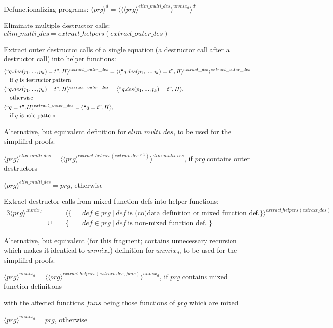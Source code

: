 \documentclass[11pt]{article} %
\begin{document}
Defunctionalizing programs: $\langle prg \rangle^d = \langle \langle \langle prg \rangle^{elim\_multi\_des} \rangle^{unmix_d} \rangle^{d'}$

Eliminate multiple destructor calls: $elim\_multi\_des = extract\_helpers(extract\_outer\_des)$

Extract outer destructor calls of a single equation (a destructor call after a destructor call) into helper functions:
\begin{alignat*}{2}
& \langle `` q.des(p_1, ..., p_k) = t ", H \rangle^{extract\_outer\_des} = \langle \langle `` q.des(p_1, ..., p_k) = t ", H \rangle^{extract\_des} \rangle^{extract\_outer\_des} \\
&\quad \textrm{if $q$ is destructor pattern } \\
& \langle `` q.des(p_1, ..., p_k) = t ", H \rangle^{extract\_outer\_des} = \big\langle `` q.des(p_1, ..., p_k) = t ", H \big\rangle, \\
&\quad \textrm{otherwise} \\
& \langle `` q = t ", H \rangle^{extract\_outer\_des} = \big\langle `` q = t ", H \big\rangle, \\
&\quad \textrm{if $q$ is hole pattern}
\end{alignat*}

\begin{framed}
Alternative, but equivalent definition for $elim\_multi\_des$, to be used for the simplified proofs.

$\langle prg \rangle^{elim\_multi\_des} = \langle \langle prg \rangle^{extract\_helpers(extract\_des^{>1})} \rangle^{elim\_multi\_des}$, if $prg$ contains outer destructors

$\langle prg \rangle^{elim\_multi\_des} = prg$, otherwise

\end{framed}

Extract destructor calls from mixed function defs into helper functions:
\begin{alignat*}{3}
\langle prg \rangle^{unmix_d} & = ~&& \langle \{ && def \in prg ~ | ~ def \textrm{ is (co)data definition or mixed function def.} \} \rangle^{extract\_helpers(extract\_des)} \\
&\cup && \{ && def \in prg ~ | ~ def \textrm{ is non-mixed function def. } \}
\end{alignat*}

\begin{framed}
Alternative, but equivalent (for this fragment; contains unnecessary recursion which makes it identical to $unmix_r$) definition for $unmix_d$, to be used for the simplified proofs.

$\langle prg \rangle^{unmix_d} = \langle \langle prg \rangle^{extract\_helpers(extract\_des, funs)} \rangle^{unmix_d}$, if $prg$ contains mixed function definitions

with the affected functions $funs$ being those functions of $prg$ which are mixed

$\langle prg \rangle^{unmix_d} = prg$, otherwise

\end{framed}
\end{document}
